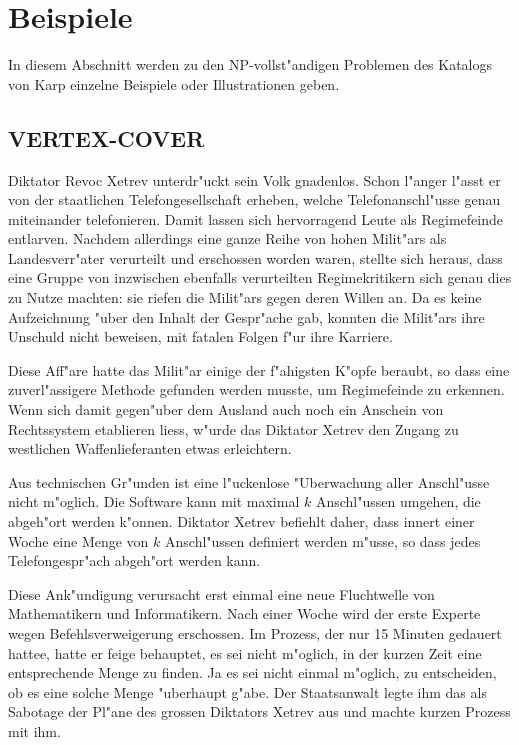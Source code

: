 \section{Beispiele}
In diesem Abschnitt werden zu den NP-vollst"andigen Problemen des
Katalogs von Karp einzelne Beispiele oder Illustrationen geben.
\subsection{VERTEX-COVER}
Diktator Revoc Xetrev unterdr"uckt sein Volk gnadenlos.
Schon l"anger l"asst er von der staatlichen Telefongesellschaft
erheben, welche Telefonanschl"usse genau miteinander telefonieren.
Damit lassen sich hervorragend Leute als Regimefeinde entlarven.
Nachdem allerdings eine ganze Reihe von hohen Milit"ars als
Landesverr"ater verurteilt und erschossen worden waren,
stellte sich heraus, dass eine Gruppe von
inzwischen ebenfalls verurteilten Regimekritikern sich genau dies
zu Nutze machten: sie riefen die Milit"ars gegen deren Willen an.
Da es keine Aufzeichnung "uber den Inhalt der Gespr"ache gab, konnten
die Milit"ars ihre Unschuld nicht beweisen, mit fatalen Folgen f"ur
ihre Karriere.

Diese Aff"are hatte das Milit"ar einige der f"ahigsten K"opfe beraubt,
so dass eine zuverl"assigere Methode gefunden werden musste, um
Regimefeinde zu erkennen.
Wenn sich damit gegen"uber dem Ausland auch noch ein Anschein von
Rechtssystem etablieren liess, w"urde das Diktator Xetrev den Zugang
zu westlichen Waffenlieferanten etwas erleichtern.

Aus technischen Gr"unden ist eine l"uckenlose "Uberwachung aller Anschl"usse
nicht m"oglich.
Die Software kann mit maximal $k$ Anschl"ussen umgehen, die abgeh"ort
werden k"onnen.
Diktator Xetrev befiehlt daher, dass innert einer Woche eine Menge
von $k$ Anschl"ussen definiert werden m"usse, so dass jedes
Telefongespr"ach abgeh"ort werden kann.

Diese Ank"undigung verursacht erst einmal eine neue Fluchtwelle von
Mathematikern und Informatikern.
Nach einer Woche wird der erste Experte wegen Befehlsverweigerung
erschossen.
Im Prozess, der nur 15 Minuten gedauert hattee, hatte er feige behauptet,
es sei nicht m"oglich, in der kurzen
Zeit eine entsprechende Menge zu finden. Ja es sei nicht einmal
m"oglich, zu entscheiden, ob es eine solche Menge "uberhaupt g"abe.
Der Staatsanwalt legte ihm das als Sabotage der Pl"ane des grossen
Diktators Xetrev aus und machte kurzen Prozess mit ihm.

